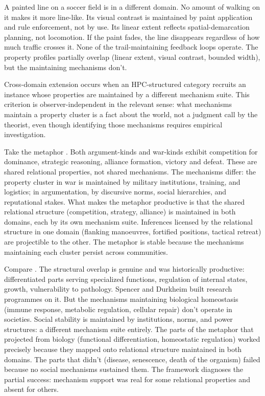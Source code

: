 \documentclass[12pt]{article}
\begin{document}
A painted line on a soccer field is in a different domain. No amount of walking on it makes it more line-like. Its visual contrast is maintained by paint application and rule enforcement, not by use. Its linear extent reflects spatial-demarcation planning, not locomotion. If the paint fades, the line disappears regardless of how much traffic crosses it. None of the trail-maintaining feedback loops operate. The property profiles partially overlap (linear extent, visual contrast, bounded width), but the maintaining mechanisms don't.

Cross-domain extension occurs when an HPC-structured category recruits an instance whose properties are maintained by a different mechanism suite. This criterion is observer-independent in the relevant sense: what mechanisms maintain a property cluster is a fact about the world, not a judgment call by the theorist, even though identifying those mechanisms requires empirical investigation.

Take the metaphor . Both argument-kinds and war-kinds exhibit competition for dominance, strategic reasoning, alliance formation, victory and defeat. These are shared relational properties, not shared mechanisms. The mechanisms differ: the property cluster in war is maintained by military institutions, training, and logistics; in argumentation, by discursive norms, social hierarchies, and reputational stakes. What makes the metaphor productive is that the shared relational structure (competition, strategy, alliance) is maintained in both domains, each by its own mechanism suite. Inferences licensed by the relational structure in one domain (flanking manoeuvres, fortified positions, tactical retreat) are projectible to the other. The metaphor is stable because the mechanisms maintaining each cluster persist across communities.

Compare . The structural overlap is genuine and was historically productive: differentiated parts serving specialized functions, regulation of internal states, growth, vulnerability to pathology. Spencer and Durkheim built research programmes on it. But the mechanisms maintaining biological homeostasis (immune response, metabolic regulation, cellular repair) don't operate in societies. Social stability is maintained by institutions, norms, and power structures: a different mechanism suite entirely. The parts of the metaphor that projected from biology (functional differentiation, homeostatic regulation) worked precisely because they mapped onto relational structure maintained in both domains. The parts that didn't (disease, senescence, death of the organism) failed because no social mechanisms sustained them. The framework diagnoses the partial success: mechanism support was real for some relational properties and absent for others.
\end{document}
